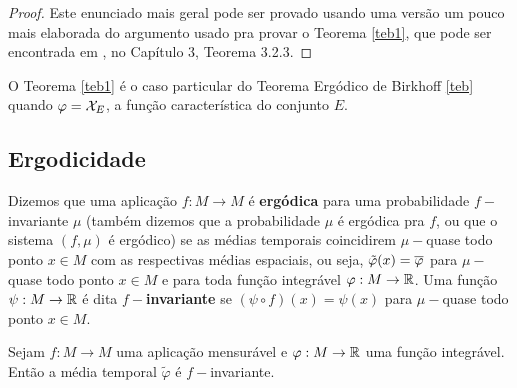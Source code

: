 \begin{proof} Este enunciado mais geral pode ser provado usando uma versão um pouco mais elaborada do argumento usado pra provar o Teorema \ref{teb1}, que pode ser encontrada em \cite{viana}, no Capítulo 3, Teorema 3.2.3.
\end{proof}

O Teorema \ref{teb1} é o caso particular do Teorema Ergódico de Birkhoff \ref{teb} quando $\varphi=\mathcal{X}_{E}$, a função característica do conjunto $E$.

\subsection{Ergodicidade} 

Dizemos que uma aplicação $f:M\to M$ é \textbf{ergódica} para uma probabilidade $f-$invariante $\mu$ (também dizemos que a probabilidade $\mu$ é ergódica pra $f$, ou que o sistema $(f,\mu)$ é ergódico) se as médias temporais coincidirem $\mu-$quase todo ponto $x\in M$ com as respectivas médias espaciais, ou seja, $\tilde{\varphi}(x)=\overline{\varphi}$ para $\mu-$quase todo ponto $x\in M$ e para toda função integrável $\varphi:M\to\mathbb{R}$. Uma função $\psi:M\to\mathbb{R}$ é dita \textbf{$f-$invariante} se $(\psi\circ f)(x)=\psi(x)$ para $\mu-$quase todo ponto $x\in M$.

\begin{proposicao}\label{tempinv} Sejam $f:M\to M$ uma aplicação mensurável e $\varphi:M\to \mathbb{R}$ uma função integrável. Então a média temporal $\tilde{\varphi}$ é $f-$invariante.
\end{proposicao}

